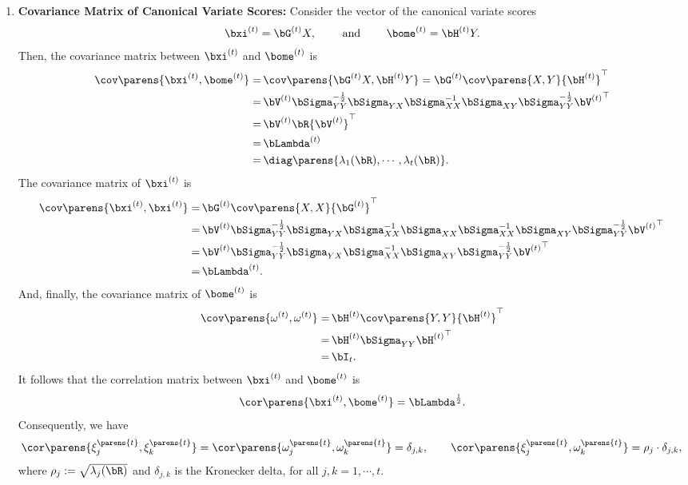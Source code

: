 \documentclass[12pt]{article}
\begin{document}
\begin{enumerate}[label=\textbf{\arabic*.}]
	\item \textbf{Covariance Matrix of Canonical Variate Scores:} Consider the vector of the canonical variate scores
	\begin{align}
		\bxi^{(t)} = \bG^{(t)} X, \qquad \text{ and } \qquad \bome^{(t)} = \bH^{(t)} Y. 
	\end{align}
	Then, the covariance matrix between $\bxi^{(t)}$ and $\bome^{(t)}$ is 
	\begin{align}
		\cov \parens{\bxi^{(t)}, \bome^{(t)}} = & \, \cov \parens{\bG^{(t)} X, \bH^{(t)} Y} = \bG^{(t)} \cov \parens{X, Y} {\bH^{(t)}}^\top \nonumber \\ 
		= & \, \bV^{(t)} \bSigma_{YY}^{-\frac{1}{2}} \bSigma_{YX} \bSigma_{XX}^{-1} \bSigma_{XY} \bSigma_{YY}^{-\frac{1}{2}} {\bV^{(t)}}^\top \nonumber \\ 
		= & \, \bV^{(t)} \bR {\bV^{(t)}}^\top \nonumber \\ 
		= & \, \bLambda^{(t)} \nonumber \\ 
		= & \, \diag \parens{\lambda_1 (\bR), \cdots, \lambda_t (\bR)}. 
	\end{align}
	The covariance matrix of $\bxi^{(t)}$ is 
	\begin{align}
		\cov \parens{\bxi^{(t)}, \bxi^{(t)}} = & \, \bG^{(t)} \cov \parens{X, X} {\bG^{(t)}}^\top \nonumber \\ 
		= & \, \bV^{(t)} \bSigma_{YY}^{-\frac{1}{2}} \bSigma_{YX} \bSigma_{XX}^{-1} \bSigma_{XX} \bSigma_{XX}^{-1} \bSigma_{XY} \bSigma_{YY}^{-\frac{1}{2}} {\bV^{(t)}}^\top \nonumber \\ 
		= & \, \bV^{(t)} \bSigma_{YY}^{-\frac{1}{2}} \bSigma_{YX} \bSigma_{XX}^{-1} \bSigma_{XY} \bSigma_{YY}^{-\frac{1}{2}} {\bV^{(t)}}^\top \nonumber \\ 
		= & \, \bLambda^{(t)}. 
	\end{align}
	And, finally, the covariance matrix of $\bome^{(t)}$ is 
	\begin{align*}
		\cov \parens{\omega^{(t)}, \omega^{(t)}} = & \, \bH^{(t)} \cov \parens{Y, Y} {\bH^{(t)}}^\top \nonumber \\ 
		= & \, \bH^{(t)} \bSigma_{YY} {\bH^{(t)}}^\top \nonumber \\ 
		= & \, \bI_t. 
	\end{align*}
	It follows that the correlation matrix between $\bxi^{(t)}$ and $\bome^{(t)}$ is 
	\begin{align}
		\cor \parens{\bxi^{(t)}, \bome^{(t)}} = \bLambda^{\frac{1}{2}}. 
	\end{align}
	Consequently, we have 
	\begin{align}
		\cor \parens{\xi_j^{\parens{t}}, \xi_k^{\parens{t}}} = \cor \parens{\omega_j^{\parens{t}}, \omega_k^{\parens{t}}} = \delta_{j,k}, \qquad \cor \parens{\xi_j^{\parens{t}}, \omega_k^{\parens{t}}} = \rho_{j} \cdot \delta_{j,k}, 
	\end{align}
	where $\rho_j := \sqrt{\lambda_j (\bR)}$ and $\delta_{j,k}$ is the Kronecker delta, for all $j, k = 1, \cdots, t$. 
	

\end{enumerate}
\end{document}
